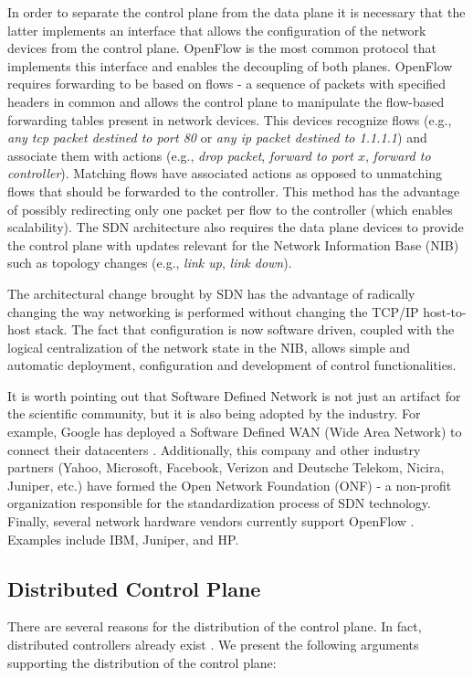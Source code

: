 In order to separate the control plane from the data plane it is necessary that the latter implements an interface that allows the configuration of the network devices from the control plane. OpenFlow \cite{openflow} is the most common protocol  that implements this interface and  enables the decoupling of both planes. OpenFlow requires forwarding to be based on flows - a sequence of packets with specified headers in common and allows the control plane to manipulate the flow-based forwarding tables present in network devices. This devices recognize flows (e.g., \emph{any tcp packet destined to port 80} or \emph{any ip packet destined to 1.1.1.1}) and associate them with actions (e.g., \emph{drop packet}, \emph{forward to port $x$}, \emph{forward to controller}). Matching flows have associated actions as opposed to unmatching flows that should be forwarded to the controller. This method has the advantage of possibly redirecting only one packet per flow to the controller (which enables scalability). The SDN architecture also requires the data plane devices to provide the control plane with  updates relevant for the Network Information Base (NIB) such as topology changes  (e.g., \emph{link up}, \emph{link down}).  

The architectural change brought by SDN has the  advantage of
radically changing  the way networking is performed  without changing
the TCP/IP host-to-host stack. The fact that configuration is now
software driven, coupled with the logical centralization of the
network state in the NIB, allows simple and automatic deployment,
configuration and development of  control functionalities. 

 It is worth pointing out that Software Defined Network is not just an
 artifact for the scientific community, but it is also being adopted
 by the industry. For example, Google has deployed a Software Defined
 WAN (Wide Area Network) to connect their datacenters
 \cite{Hoezle:2012uq}. Additionally, this company and other industry
 partners (Yahoo, Microsoft, Facebook, Verizon and Deutsche Telekom,
 Nicira, Juniper, etc.) have formed the Open Network Foundation (ONF)
 \cite{onf} - a non-profit organization  responsible for the
 standardization process of SDN technology. Finally, several network
 hardware vendors currently support OpenFlow \cite{openflow}. Examples
 include IBM, Juniper, and HP. 

\subsection{Distributed Control Plane}
There are several reasons for the distribution of the control plane. In fact, distributed controllers already exist \distcontrollers. We present the following arguments supporting the distribution of the control plane: 

